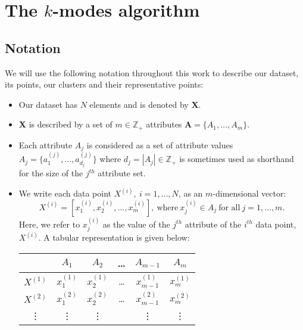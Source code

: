 \section{The \(k\)-modes algorithm}\label{sec:kmodes}

\subsection{Notation}\label{subsec:notation}

We will use the following notation throughout this work to describe our dataset,
its points, our clusters and their representative points:

\begin{itemize}
    \item Our dataset has \(N\) elements and is denoted by \textbf{X}.
    \item \textbf{X} is described by a set of \(m \in \mathbb{Z}_+\) attributes 
        \(\textbf{A} = \{A_1, \ldots, A_m\}\).
    \item Each attribute \(A_j\) is considered as a set of attribute values 
        \(A_j = \{a_1^{(j)}, \ldots, a_{d_j}^{(j)}\}\) where \(d_j = |A_j| \in 
        \mathbb{Z}_+\) is sometimes used as shorthand for the size of the 
        \(j^{th}\) attribute set.
    \item We write each data point \(X^{(i)}, \ i = 1, \ldots, N\), as an 
        \(m\)-dimensional vector:
	    \[
		    X^{(i)} = \left[x_1^{(i)}, x_2^{(i)}, \ldots, x_m^{(i)}\right], \
            \text{where} \ x_j^{(i)} \in A_j \ \text{for all} \ j = 1, \ldots, 
            m.
	    \]
        Here, we refer to \(x_j^{(i)}\) as the value of the \(j^{th}\) attribute
        of the \(i^{th}\) data point, \(X^{(i)}\). A tabular representation is 
        given below:
        \begin{table}[H]
        \centering
        \begin{tabular}{cccccc}
            {} & \(A_1\) & \(A_2\) & \quad \ldots \quad & \(A_{m-1}\) & \(A_m\)
            \\
            \midrule
            \(X^{(1)}\) & \(x_1^{(1)}\) & \(x_2^{(1)}\) & \quad \ldots \quad & 
            \(x_{m-1}^{(1)}\) & \(x_m^{(1)}\)
            \\
            \(X^{(2)}\) & \(x_1^{(2)}\) & \(x_2^{(2)}\) & \quad \ldots \quad &
            \(x_{m-1}^{(2)}\) & \(x_m^{(2)}\)
            \\
            \vdots & \vdots & \vdots & {} & \vdots & \vdots
            \\

\end{tabular}
\end{table}
\end{itemize}
